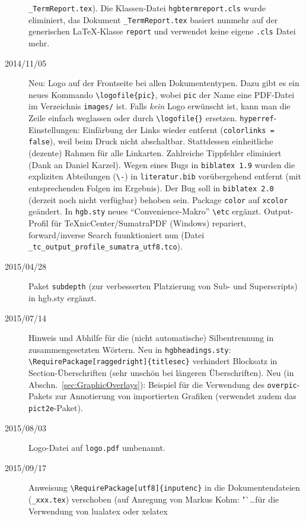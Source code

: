 \begin{sloppypar}
\begin{description}
\texttt{\_TermReport.tex}).
\newline
Die Klassen-Datei \texttt{hgbtermreport.cls} wurde eliminiert, das Dokument \texttt{\_TermReport.tex} basiert nunmehr
auf der generischen LaTeX-Klasse \texttt{report}  und verwendet keine eigene \texttt{.cls} Datei mehr.
%
\item[2014/11/05]
Neu: Logo auf der Frontseite bei allen Dokumententypen. Dazu gibt es ein neues Kommando
\verb!\logofile{pic}!, wobei \verb!pic! der Name eine PDF-Datei im
Verzeichnis \verb!images/! ist. Falls \emph{kein} Logo erwünscht ist, 
kann man die Zeile einfach weglassen oder durch \verb!\logofile{}! ersetzen.
\newline
\texttt{hyperref}-Einstellungen: Einfärbung der Links wieder entfernt (\texttt{colorlinks = false}), weil beim Druck
nicht abschaltbar. Stattdessen einheitliche (dezente) Rahmen für alle Linkarten.
Zahlreiche Tippfehler eliminiert (Dank an Daniel Karzel).
\newline
Wegen eines Bugs in \texttt{biblatex 1.9} wurden die expliziten Abteilungen (\verb!\-!) in \texttt{literatur.bib}
vorübergehend entfernt (mit entsprechenden Folgen im Ergebnis). Der Bug soll in \texttt{biblatex 2.0} (derzeit noch
nicht verfügbar) behoben sein.
\newline
Package \texttt{color} auf \texttt{xcolor} geändert. In \texttt{hgb.sty} neues "`Convenience-Makro"' \verb!\etc! ergänzt.
Output-Profil für TeXnicCenter/SumatraPDF (Windows) repariert, forward/inverse Search fuunktioniert nun
(Datei \verb!_tc_output_profile_sumatra_utf8.tco!).
%
\item[2015/04/28]
Paket \texttt{subdepth} (zur verbesserten Platzierung von Sub- und Superscripts) 
in hgb.sty ergänzt.
%
\item[2015/07/14]
Hinweis und Abhilfe für die (nicht automatische) Silbentrennung in zusammengesetzten Wörtern.
Neu in \texttt{hgbheadings.sty}: \verb!\RequirePackage[raggedright]{titlesec}! verhindert Blocksatz
in Section-Überschriften (sehr unschön bei längeren Überschriften). 
Neu (in Abschn.~\ref{sec:GraphicOverlays}): Beispiel für die Verwendung des \texttt{overpic}-Pakets
zur Annotierung von importierten Grafiken (verwendet zudem das \texttt{pict2e}-Paket).
%
\item[2015/08/03]
Logo-Datei auf \texttt{logo.pdf} umbenannt.
\item[2015/09/17]
Anweisung \verb!\RequirePackage[utf8]{inputenc}! in die Doku\-menten\-dateien (\texttt{\_xxx.tex})
verschoben (auf Anregung von Markus Kohm: "`\ldots für die Verwendung von lualatex oder xelatex 

\end{description}
\end{sloppypar}
